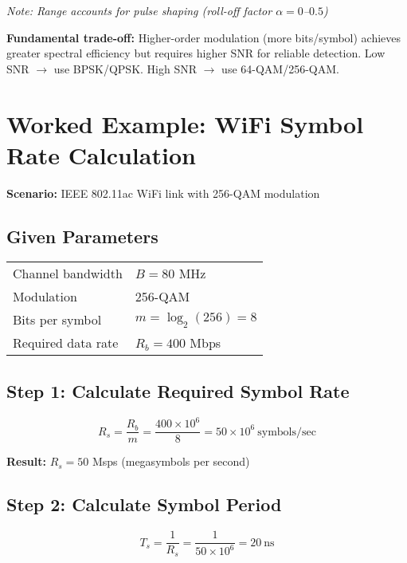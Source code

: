\textit{Note: Range accounts for pulse shaping (roll-off factor $\alpha = 0$--$0.5$)}

\begin{keyconcept}
\textbf{Fundamental trade-off:} Higher-order modulation (more bits/symbol) achieves greater spectral efficiency but requires higher SNR for reliable detection. Low SNR $\rightarrow$ use BPSK/QPSK. High SNR $\rightarrow$ use 64-QAM/256-QAM.
\end{keyconcept}

\section{Worked Example: WiFi Symbol Rate Calculation}

\textbf{Scenario:} IEEE 802.11ac WiFi link with 256-QAM modulation

\subsection*{Given Parameters}

\begin{tabular}{@{}ll@{}}
Channel bandwidth & $B = 80$ MHz \\
Modulation & 256-QAM \\
Bits per symbol & $m = \log_2(256) = 8$ \\
Required data rate & $R_b = 400$ Mbps \\
\end{tabular}

\subsection*{Step 1: Calculate Required Symbol Rate}

\begin{equation}
R_s = \frac{R_b}{m} = \frac{400 \times 10^6}{8} = 50 \times 10^6\ \text{symbols/sec}
\end{equation}

\textbf{Result:} $R_s = 50$ Msps (megasymbols per second)

\subsection*{Step 2: Calculate Symbol Period}

\begin{equation}
T_s = \frac{1}{R_s} = \frac{1}{50 \times 10^6} = 20\ \text{ns}
\end{equation}

